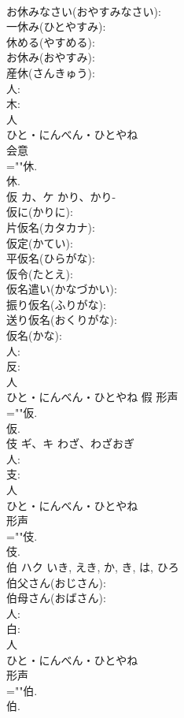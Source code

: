 \documentclass[8pt]{extreport}
\begin{document}
\begin{CJK}{UTF8}{min}
\\	お休みなさい(おやすみなさい): 
\\	一休み(ひとやすみ): 
\\	休める(やすめる): 
\\	お休み(おやすみ): 
\\	産休(さんきゅう): 
\\	人: 
\\	木: 
\\	人	
\\	ひと・にんべん・ひとやね	
\\	会意 
\\	=""休.
\\	休.
\\	仮	カ、ケ	かり、かり-		
\\	仮に(かりに): 
\\	片仮名(カタカナ): 
\\	仮定(かてい): 
\\	平仮名(ひらがな): 
\\	仮令(たとえ): 
\\	仮名遣い(かなづかい): 
\\	振り仮名(ふりがな): 
\\	送り仮名(おくりがな): 
\\	仮名(かな): 
\\	人: 
\\	反: 
\\	人	
\\	ひと・にんべん・ひとやね	假	形声 
\\	=""仮.
\\	仮.
\\	伎	ギ、キ	わざ、わざおぎ		
\\	人: 
\\	支: 
\\	人	
\\	ひと・にんべん・ひとやね	
\\	形声 
\\	=""伎.
\\	伎.
\\	伯	ハク		いき, えき, か, き, は, ひろ	
\\	伯父さん(おじさん): 
\\	伯母さん(おばさん): 
\\	人: 
\\	白: 
\\	人	
\\	ひと・にんべん・ひとやね	
\\	形声 
\\	=""伯.
\\	伯.

\end{CJK}
\end{document}
